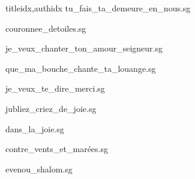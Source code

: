 \documentclass[12pt]{article}
\begin{document}
\begin{songs}{titleidx,authidx}
{tu_fais_ta_demeure_en_nous.sg}


{couronnee_detoiles.sg}


{je_veux_chanter_ton_amour_seigneur.sg}


{que_ma_bouche_chante_ta_louange.sg}


{je_veux_te_dire_merci.sg}


{jubliez_criez_de_joie.sg}


{dans_la_joie.sg}


{contre_vents_et_marées.sg}


{evenou_shalom.sg}


\end{songs}
\end{document}
